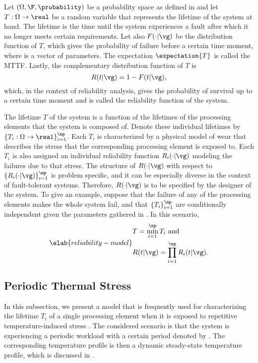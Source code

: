 \newcommand{\mean}{\mu}
\newcommand{\scale}{\eta}
\newcommand{\shape}{\beta}

Let $(\Omega, \F, \probability)$ be a probability space as defined in
 and let $T: \Omega \to \real$ be a random variable
that represents the lifetime of the system at hand. The lifetime is the time
until the system experiences a fault after which it no longer meets certain
requirements. Let also $F(\cdot | \vg)$ be the distribution function of $T$,
which gives the probability of failure before a certain time moment, where \vg
is a vector of parameters. The expectation $\expectation{T}$ is called the
\ac{MTTF}. Lastly, the complementary distribution function of $T$ is
\[
  R(t | \vg) = 1 - F(t | \vg),
\]
which, in the context of reliability analysis, gives the probability of survival
up to a certain time moment and is called the reliability function of the
system.

The lifetime $T$ of the system is a function of the lifetimes of the \np
processing elements that the system is composed of. Denote these individual
lifetimes by $\{ T_i: \Omega \to \real \}_{i = 1}^\np$. Each $T_i$ is
characterized by a physical model of wear \cite{jedec2016} that describes the
stress that the corresponding processing element is exposed to. Each $T_i$ is
also assigned an individual reliability function $R_i(\cdot | \vg)$ modeling the
failures due to that stress. The structure of $R(\cdot | \vg)$ with respect to
$\{ R_i(\cdot | \vg) \}_{i = 1}^\np$ is problem specific, and it can be
especially diverse in the context of fault-tolerant systems. Therefore, $R(\cdot
| \vg)$ is to be specified by the designer of the system. To give an example,
suppose that the failure of any of the \np processing elements makes the whole
system fail, and that $\{ T_i \}_{i = 1}^\np$ are conditionally independent
given the parameters gathered in \vg. In this scenario,
\begin{equation} \elab{reliability-model}
  \begin{split}
    & T = \min_{i = 1}^\np T_i \text{ and} \\
    & R(t | \vg) = \prod_{i = 1}^\np R_i(t | \vg).
  \end{split}
\end{equation}

\subsection{Periodic Thermal Stress}

In this subsection, we present a model that is frequently used for
characterizing the lifetime $T_i$ of a single processing element when it is
exposed to repetitive temperature-induced stress \cite{huang2009b, xiang2010}.
The considered scenario is that the system is experiencing a periodic workload
with a certain period denoted by \period. The corresponding temperature profile
is then a dynamic steady-state temperature profile, which is discussed in
.

